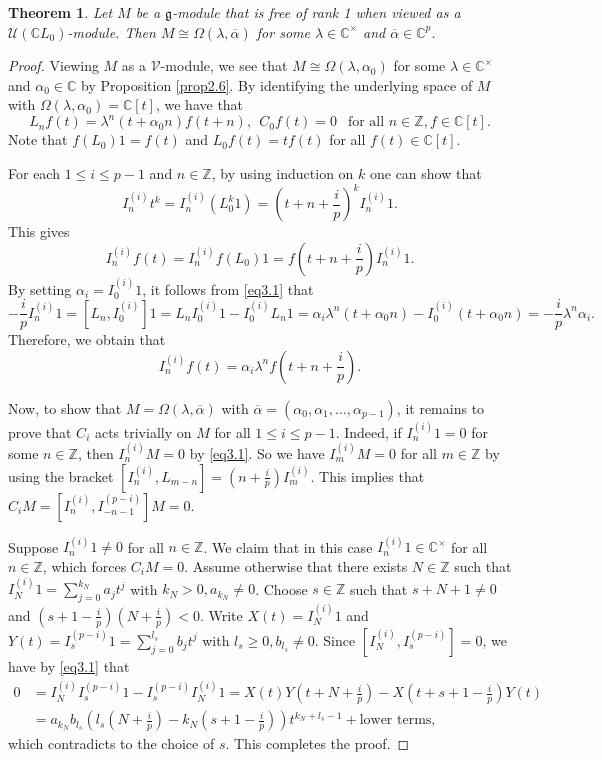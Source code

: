 \documentclass[12pt, reqno]{amsart}
\numberwithin{equation}{section}
\newtheorem{theorem}{Theorem}[section]
\numberwithin{equation}{section}
\def\lmd{\lambda}
\def\al{\alpha}
\def\g{\mathfrak{g}}
\def\U{\mathcal{U}}
\def\V{\mathcal{V}}
\newcommand{\C}{\mathbb C}
\newcommand{\Z}{\mathbb{Z}}
\newcommand{\ov}[1]{\overline{#1}}
\newcommand{\elei}[2]{I_{#1}^{(#2)}}
\begin{document}
\begin{theorem}\label{thm3.2}
Let $M$ be a $\g$-module that is free of rank 1 when viewed as a $\U(\C L_0)$-module.
Then $M\cong\Omega(\lmd,\ov\al)$ for some $\lmd\in\C^\times$ and $\ov\al\in\C^p$.
\end{theorem}
\begin{proof}
 Viewing $M$ as a $\V$-module, we see that $M\cong\Omega(\lmd,\al_0)$ for some $\lmd\in\C^\times$ and $\al_0\in\C$ by Proposition \ref{prop2.6}. By identifying the underlying space of $M$ with $\Omega(\lmd,\al_0)=\C[t]$, we have that
 $$L_nf(t)=\lmd^n(t+\al_0n)f(t+n),\ \ C_0f(t)=0\ \ \text{ for all } n\in\Z, f\in\C[t].$$
 Note that $f(L_0)1=f(t)$ and $L_0f(t)=tf(t)$ for all $f(t)\in\C[t]$.

 For each $1\leq i\leq p-1$ and $n\in\Z$, by using induction on $k$ one can show that
 \[\elei nit^k=\elei ni(L_0^k1)=\left(t+n+\frac ip\right)^k\elei ni 1.\]
 This gives
 \begin{equation}\label{eq3.1}
   \elei nif(t)=\elei nif(L_0)1=f\left(t+n+\frac ip\right)\elei ni 1.
 \end{equation}
 By setting $\al_i=\elei 0i1$, it follows from
 \eqref{eq3.1} that
 $$-\frac ip\elei ni1=[L_n,\elei 0i]1=L_n\elei 0i1-\elei 0i L_n 1
        =\al_i\lmd^n(t+\al_0n)-\elei 0i(t+\al_0n)=-\frac ip\lmd^n\alpha_i.$$
 Therefore, we obtain that
 $$\elei nif(t)=\al_i\lmd^nf\left(t+n+\frac ip\right).$$


 Now, to show that $M=\Omega(\lmd,\ov\al)$ with $\ov\al=(\al_0,\al_1,\dots,\al_{p-1})$,
 it remains to prove that $C_i$ acts trivially on $M$ for all $1\le i\le p-1$.
 Indeed, if $\elei ni 1=0$ for some $n\in\Z$,
 then $\elei ni M=0$ by \eqref{eq3.1}.
 So we have $\elei mi M=0$ for all $m\in\Z$ by using the bracket $[\elei ni,L_{m-n}]=\left(n+\frac ip\right)\elei mi$.
 This implies that $C_iM=[\elei ni,\elei {-n-1}{p-i}]M=0$.

 Suppose $\elei ni 1\neq0$ for all $n\in\Z$.
 We claim that in this case $\elei ni 1\in\C^\times$ for all $n\in\Z$, which forces $C_iM=0$.
 Assume otherwise that there exists $N\in\Z$ such that $\elei Ni 1=\sum_{j=0}^{k_N}a_jt^j$ with $k_N>0, a_{k_N}\neq 0$.
 Choose $s\in\Z$ such that $s+N+1\neq 0$ and $\left(s+1-\frac ip\right)\left(N+\frac ip\right)<0$.
 Write $X(t)=\elei Ni 1$ and $Y(t)=\elei s{p-i}1=\sum_{j=0}^{l_s}b_jt^j$ with $l_s\geq0, b_{l_s}\neq 0$.
 Since $[\elei Ni,\elei s{p-i}]=0$, we have by \eqref{eq3.1} that
 \begin{align*}
  0&=\elei Ni\elei s{p-i}1-\elei s{p-i}\elei Ni 1
      =X(t)Y\left(t+N+\frac ip\right)-X\left(t+s+1-\frac ip\right)Y(t)\\
   &=a_{k_N}b_{l_s}\left(l_s\left(N+\frac ip\right)-k_N\left(s+1-\frac ip\right)\right)t^{k_N+l_s-1}
     +\text{lower terms},
 \end{align*}
 which contradicts to the choice of $s$. This completes the proof.
\end{proof}
\end{document}
